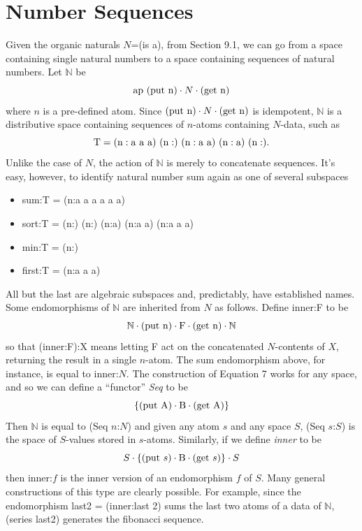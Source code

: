 \documentclass[11pt]{article}
\begin{document}
\section{Number Sequences}

      Given the organic naturals $N$=(is a), from Section 9.1, we can go from a space containing single natural numbers to a space 
containing sequences of natural numbers.  
Let $\mathbb{N}$ be 
\begin{equation}
{{\rm ap}\ ({\rm put\ {\rm n}})\cdot N \cdot ({\rm get\ {\rm n}})}
\end{equation}
where $n$ is a pre-defined atom.  Since $({\rm put\ n})\cdot N \cdot ({\rm get\ n})$ is idempotent, ${\mathbb N}$ is a distributive space containing 
sequences of $n$-atoms containing $N$-data, such as 
\begin{equation} 
{\rm T = (n:a\ a\ a)\ (n:)\ (n:a\ a)\ (n:a)\ (n:)}.
\end{equation} 
Unlike the case of $N$, the action of ${\mathbb N}$ is merely to concatenate sequences.  It's easy, however, to identify 
natural number sum again as one of several subspaces 
\begin{itemize}
\item sum:T = (n:a a a a a a)
\item sort:T = (n:) (n:) (n:a) (n:a a) (n:a a a)
\item min:T = (n:)
\item first:T = (n:a a a)
\end{itemize} 
All but the last are algebraic subspaces and, predictably, have established names.  
Some endomorphisms of ${\mathbb N}$ are inherited from $N$ as follows.  Define inner:F to be 
\begin{equation}
{\mathbb N}\cdot({\rm put\ n})\cdot {\rm F}\cdot({\rm get\ n})\cdot{\mathbb N}
\end{equation}
so that (inner:F):X means letting F act on the concatenated $N$-contents of $X$, returning the result in a single $n$-atom.  The sum endomorphism 
above, for instance, is equal to inner:$N$.  The construction of Equation 7 works for any space, and so we can define a ``functor'' {\it Seq} to be 
\begin{equation}
\{({\rm put}\ {\rm A})\cdot {\rm B} \cdot ({\rm get}\ {\rm A})\}
\end{equation}
Then {$\mathbb N$} is equal to (Seq $n$:$N$) and given any atom $s$ and any space $S$, (Seq $s$:$S$) is the space of $S$-values stored in $s$-atoms.  
Similarly, if we define {\it inner} to be  
\begin{equation}
S\cdot\{({\rm put}\ s)\cdot{\rm B}\cdot({\rm get}\ s)\}\cdot S
\end{equation}
then inner:$f$ is the inner version of an endomorphism $f$ of $S$.  Many general constructions of this type are clearly possible.  For example, 
since the endomorphism last2 = (inner:last 2) sums the last two atoms of a data of ${\mathbb N}$, (series last2) generates the fibonacci sequence. 
\end{document}
